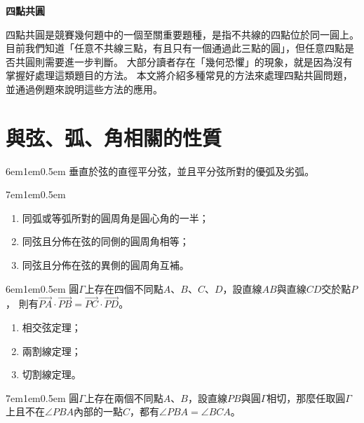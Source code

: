 \documentclass[12pt]{article}
\begin{document}
\thispagestyle{fancy}  %
\begin{center}
    \textbf{\Large{四點共圓}}
\end{center}
四點共圓是競賽幾何題中的一個至關重要題種，是指不共線的四點位於同一圓上。
目前我們知道「任意不共線三點，有且只有一個通過此三點的圓」，但任意四點是否共圓則需要進一步判斷。
大部分讀者存在「幾何恐懼」的現象，就是因為沒有掌握好處理這類題目的方法。
本文將介紹多種常見的方法來處理四點共圓問題，並通過例題來說明這些方法的應用。

\begin{quotation}
    \centering
\end{quotation}
\section{與弦、弧、角相關的性質}
\begin{mybox}[垂徑定理]{6em}{1em}{0.5em}
    垂直於弦的直徑平分弦，並且平分弦所對的優弧及劣弧。
\end{mybox}
\begin{mybox}[圓周角定理]{7em}{1em}{0.5em}
    \begin{enumerate}[label= \arabic*., itemsep=0.2em]
        \item 同弧或等弧所對的圓周角是圓心角的一半；
        \item 同弦且分佈在弦的同側的圓周角相等；
        \item 同弦且分佈在弦的異側的圓周角互補。
    \end{enumerate}
\end{mybox}
\begin{mybox}[圓冪定理]{6em}{1em}{0.5em}
    圓$\Gamma$上存在四個不同點$A$、$B$、$C$、$D$，設直線$AB$與直線$CD$交於點$P$，
    則有$\overrightarrow{PA}\cdot\overrightarrow{PB}=\overrightarrow{PC}\cdot\overrightarrow{PD}$。
    \begin{enumerate}[label= \arabic*., itemsep=0.2em]
        \item 相交弦定理；
        \item 兩割線定理；
        \item 切割線定理。
    \end{enumerate}
\end{mybox}
\begin{mybox}[弦切角定理]{7em}{1em}{0.5em}
    圓$\Gamma$上存在兩個不同點$A$、$B$，設直線$PB$與圓$\Gamma$相切，那麼任取圓$\Gamma$上且不在$\angle{PBA}$內部的一點$C$，都有$\angle{PBA}=\angle{BCA}$。
\end{mybox}
\newpage
\end{document}
